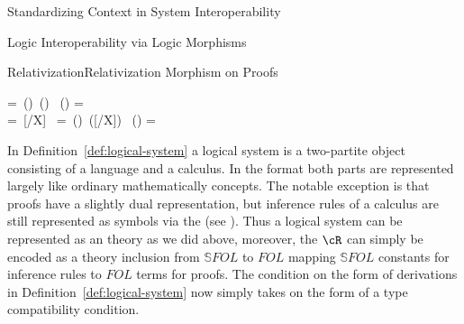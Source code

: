 \begin{omgroup}[id=logics,creators=miko]{Standardizing Context in System Interoperability}
\begin{omgroup}[id=logic.morphisms]{Logic Interoperability via Logic Morphisms}
\begin{myfig}{Relativization}{Relativization Morphism on Proofs}
\begin{textnd}
{                        {\bA\bB\ofsort\sortc}
                        {}}
    =\hbox{
                        {\sortb(\bB)}
                        {\sortc(\bA\bB)}
                        {}}
    \cR\left(\raisebox{-.3cm}{\box0}\vspace*{-.5cm}\right)
    \;\;=\;\;\raisebox{-.8cm}{\box1}\\
    =\hbox{
                        {\bB\colon\sortb}
                        {[\bB/X]\bA}
                        {}}
    =\hbox{
                        {\sortb(\bB)}
                        {\cR([\bB/X]\bA)}
                        {}}
    \cR\left(\raisebox{-.3cm}{\box0}\vspace*{-.5cm}\right)
    \;\;=\;\;\raisebox{-.8cm}{\box1}
  \end{textnd}
\end{myfig}

In Definition~\ref{def:logical-system} a logical system is a two-partite object consisting
of a language and a calculus. In the {} {\omdoc}
format both parts are represented largely like ordinary mathematically concepts. The
notable exception is that proofs have a slightly dual representation, but inference rules
of a calculus are still represented as symbols via the
{} (see {}). Thus a logical system
can be represented as an {\omdoc} theory as we did above, moreover, the
{} $\cR$ can simply be encoded as a theory inclusion from
${\mathbb S} FOL$ to $FOL$ mapping ${\mathbb S} FOL$ constants for inference rules to
$FOL$ terms for proofs. The condition on the form of derivations in
Definition~\ref{def:logical-system} now simply takes on the form of a type compatibility
condition.
\end{omgroup}
\end{omgroup}

